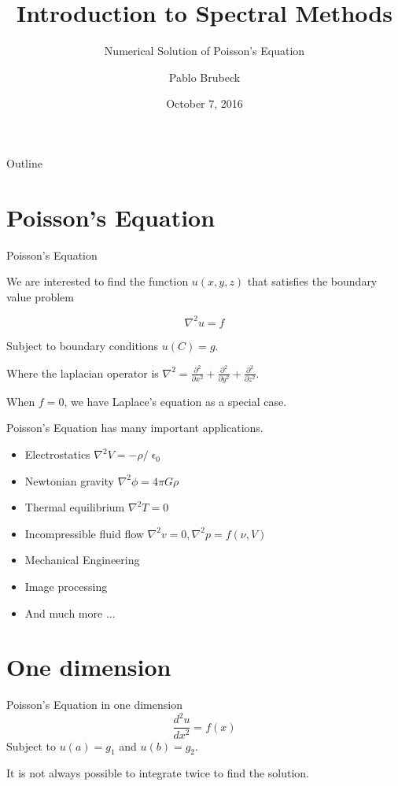 \documentclass[xcolor={dvipsnames}]{beamer}
\title{Introduction to Spectral Methods}
\subtitle{Numerical Solution of Poisson's Equation}
\author{Pablo Brubeck\inst{}}
\institute[ITESM]{
	\inst{}
	Department of Physics\\
	Tecnologico de Monterrey
}
\date{October 7, 2016}
\begin{document}
\begin{frame}
	\titlepage
\end{frame}

\begin{frame}{Outline}
	\tableofcontents
\end{frame}


\section{Poisson's Equation}
\begin{frame}{Poisson's Equation}{}

We are interested to find the function $u(x,y,z)$ that satisfies the boundary value problem

\begin{equation*}
\nabla^2 u = f
\end{equation*}

Subject to boundary conditions $u(C)=g$.

\pause
\bigskip
Where the laplacian operator is $\nabla^2=\frac{\partial^2}{\partial x^2}+\frac{\partial^2}{\partial y^2}+\frac{\partial^2}{\partial z^2}$.

\pause
\bigskip
When $f=0$, we have Laplace's equation as a special case.
\end{frame}


\begin{frame}{Poisson's Equation has many important applications.}{}
\begin{itemize}[<+->]
\item Electrostatics $\nabla^2 V = - \rho/\upvarepsilon_0$
\item Newtonian gravity $\nabla^2 \phi = 4\pi G\rho$
\item Thermal equilibrium $\nabla^2 T = 0$
\item Incompressible fluid flow $\nabla^2 v = 0, \nabla^2 p = f(\nu,V)$
\item Mechanical Engineering 
\item Image processing
\item And much more ...
\end{itemize}

\end{frame}


\section{One dimension}
\begin{frame}{Poisson's Equation in one dimension}{}
\begin{equation*}
\frac{d^2u}{dx^2}=f(x)
\end{equation*}
\vfill
Subject to $u(a)=g_1$ and  $u(b)=g_2$.

\bigskip
It is not always possible to integrate twice to find the solution.
\end{frame}
\end{document}

